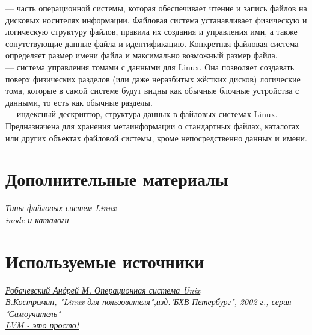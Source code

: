 \documentclass[14pt, a4paper]{article}
\begin{document}
\noindent \href{https://opencentr.ru/article/fajlovaya-sistema-linux/}{} — часть операционной системы, которая обеспечивает чтение и запись файлов
на дисковых носителях информации. Файловая система устанавливает физическую и логическую
структуру файлов, правила их создания и управления ими, а также сопутствующие данные файла и
идентификацию. Конкретная файловая система определяет размер имени файла и максимально
возможный размер файла.\\

\noindent \href{https://help.ubuntu.ru/wiki/lvm}{} — система управления томами с данными для Linux. Она позволяет
создавать поверх физических разделов (или даже неразбитых жёстких дисков) логические тома,
которые в самой системе будут видны как обычные блочные устройства с данными, то есть как
обычные разделы.\\

\noindent \href{https://ru.wikipedia.org/wiki/Inode}{} — индексный дескриптор, структура данных в файловых системах Linux. Предназначена для
хранения метаинформации о стандартных файлах, каталогах или других объектах файловой
системы, кроме непосредственно данных и имени.

\section*{Дополнительные материалы} 

\href{https://losst.ru/tipy-fajlovyh-sistem-dlya-linux}{\textit{Типы файловых систем Linux}}\\

\noindent \href{http://parallel.uran.ru/book/export/html/382}{\textit{inode и каталоги}}

\section*{Используемые источники} 

\href{https://it.wikireading.ru/6453}{\textit{Робачевский Андрей М. Операционная система Unix}}\\

\noindent \href{https://www.linuxcenter.ru/lib/books/kostromin}{\textit{В.Костромин, "Linux для пользователя",изд."БХВ-Петербург", 2002 г., серия "Самоучитель"}}\\

\noindent \href{https://habr.com/ru/post/67283/}{\textit{LVM - это просто!}}
\end{document}
